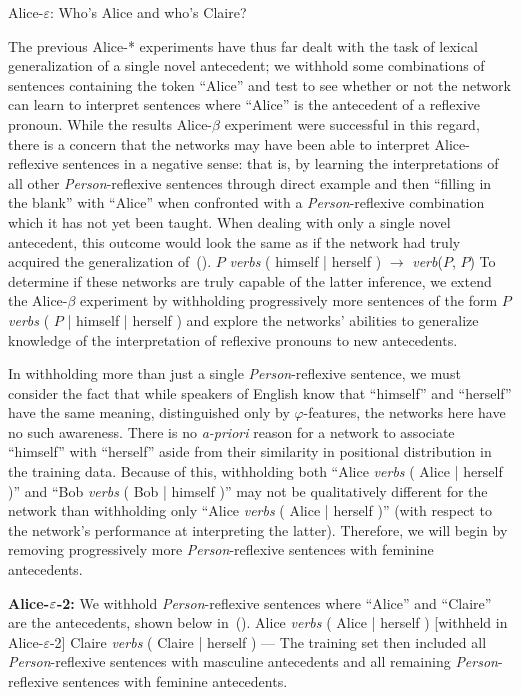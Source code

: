 \ssec Alice-$\varepsilon$: Who's Alice and who's Claire?

The previous Alice-* experiments have thus far dealt with the task of lexical 
generalization of a single novel antecedent; we withhold some combinations of
sentences containing the token ``Alice'' and test to see whether or not the
network can learn to interpret sentences where ``Alice'' is the antecedent 
of a reflexive pronoun. While the results Alice-$\beta$ experiment were 
successful  in this regard, there is a concern that the networks may have been 
able to interpret Alice-reflexive sentences in a negative sense: that is, by 
learning the interpretations of all other {\em Person}-reflexive sentences 
through direct example and then ``filling in the blank'' with ``Alice'' when 
confronted with a {\em Person}-reflexive combination which it has not yet been 
taught. When dealing with only a single novel antecedent, this outcome would 
look the same as if the network had truly acquired the generalization 
of~(\nextx).
\ex
	$P$ {\em verbs} ( himself | herself ) $\to$ {\em verb}($P$, $P$)
\xe
To determine if these networks are truly capable of the latter inference, we
extend the Alice-$\beta$ experiment by withholding progressively more 
sentences of the form 
\ex
	$P$ {\em verbs} ( $P$ | himself | herself )
\xe
and explore the networks' abilities to generalize knowledge of the 
interpretation of reflexive pronouns to new antecedents.

In withholding more than just a single {\em Person}-reflexive sentence, we must
consider the fact that while speakers of English know that ``himself'' and
``herself'' have the same meaning, distinguished only by $\varphi$-features,
the networks here have no such awareness. There is no {\em a-priori} reason for
a network to associate ``himself'' with ``herself'' aside from their 
similarity in positional distribution in the training data. Because of this,
withholding both ``Alice {\em verbs} ( Alice | herself )'' and 
``Bob {\em verbs} ( Bob | himself )'' may not be qualitatively 
different for the network than withholding only ``Alice {\em verbs} ( Alice | 
herself )'' (with respect to the network's performance at 
interpreting the latter). Therefore, we will begin by removing progressively 
more {\em Person}-reflexive sentences with feminine antecedents.

\bigskip\noindent
{\bf Alice-$\boldmath \varepsilon$-2:} We withhold 
{\em Person}-reflexive sentences where ``Alice'' and ``Claire'' are the 
antecedents, shown below in~(\nextx).
\pex
	\a Alice {\em verbs} ( Alice | herself ) \hfill [withheld in Alice-$\varepsilon$-2]
	\a Claire {\em verbs} ( Claire | herself ) \hfill ---
\xe
The training set then included all {\em Person}-reflexive sentences with 
masculine antecedents and all remaining {\em Person}-reflexive sentences with
feminine antecedents. 

